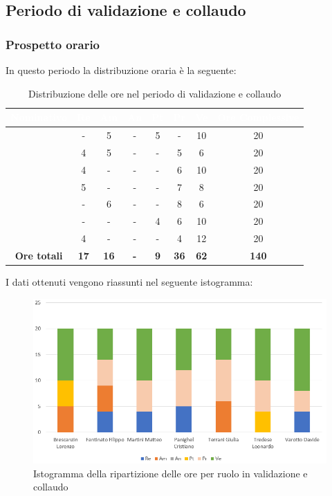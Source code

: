 \subsection{Periodo di validazione e collaudo}
\subsubsection{Prospetto orario}
In questo periodo la distribuzione oraria è la seguente:
\begin{table}[H]
	\begin{center}
		\begin{tabular}{ |c c c c c c c c| }
		\rowcolor{darkblue} 
		\textcolor{white}{\textbf{Nominativo}} & \textcolor{white}{\textbf{Re}} & \textcolor{white}{\textbf{Am}} & \textcolor{white}{\textbf{An}} & \textcolor{white}{\textbf{Pt}} & \textcolor{white}{\textbf{Pr}} & \textcolor{white}{\textbf{Ve}} & \textcolor{white}{\textbf{Ore Complessive}} \\ \hline
		\BL 	& -  	& 5  	& - 	& 5 	& - 	& 10 	& 20 \\ \hline
		\FF 	& 4  	& 5  	& - 	& - 	& 5 	& 6  	& 20 \\ \hline
		\MM 	& 4 	& - 	& - 	& - 	& 6 	& 10  	& 20 \\ \hline
		\PC 	& 5 	& -  	& - 	& - 	& 7 	& 8 	& 20 \\ \hline
		\TG 	& -  	& 6 	& - 	& - 	& 8 	& 6 	& 20 \\ \hline
		\TL 	& -  	& - 	& - 	& 4 	& 6 	& 10 	& 20 \\ \hline
		\VD 	& 4  	& -  	& - 	& - 	& 4 	& 12  	& 20 \\ \hline
		\textbf{Ore totali} & \textbf{17} & \textbf{16} & \textbf{-} & \textbf{9} & \textbf{36} & \textbf{62} & \textbf{140} \\ \hline
		\end{tabular}
	\caption{Distribuzione delle ore nel periodo di validazione e collaudo}
	\end{center}
\end{table}
I dati ottenuti vengono riassunti nel seguente istogramma:
\begin{figure}[H]
    \centering
    \includegraphics[scale = 0.70]{Immagini/ValidazioneIsto.png}
    \caption{Istogramma della ripartizione delle ore per ruolo in validazione e collaudo}
    \label{fig:istogramma ripartizione ore, periodo di Validazione e Collaudo}
\end{figure}
\newpage
